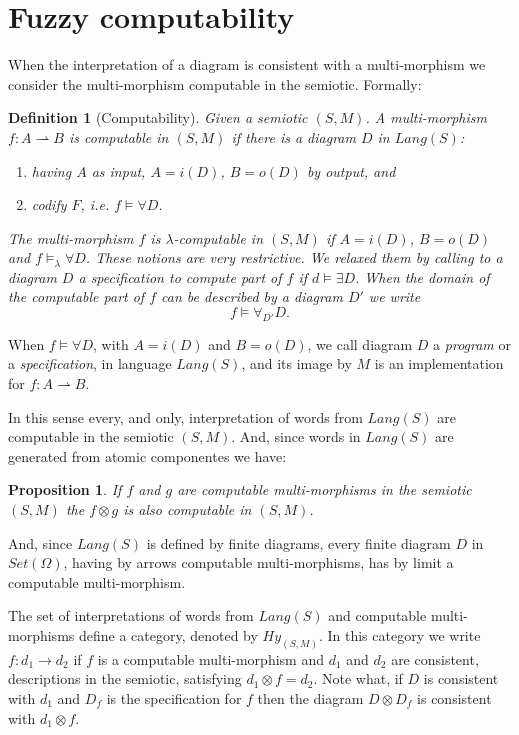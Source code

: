 \documentclass[oribibl]{llncs}
\newtheorem{prop}{Proposition}
\newtheorem{defn}{Definition}
\begin{document}
\section{Fuzzy computability}\label{fuzzy computability}
When the interpretation of a diagram is consistent with a multi-morphism we consider the multi-morphism computable in the semiotic. Formally:
\begin{defn}[Computability]
Given a semiotic $(S,M)$. A multi-morphism $f:A\rightharpoonup B$ is computable in $(S,M)$ if there is a diagram $D$ in $Lang(S)$:
\begin{enumerate}
  \item having $A$ as input, $A=i(D)$, $B=o(D)$ by output, and
  \item codify $F$, i.e. $f\models \forall D$.
\end{enumerate}
The multi-morphism $f$ is $\lambda$-computable in $(S,M)$ if $A=i(D)$, $B=o(D)$ and  $f\models_\lambda
\forall D$. These notions are very restrictive. We  relaxed them by calling to a diagram $D$ a specification to compute part of $f$ if
$d\models \exists D$. When the domain of the computable part of $f$ can be described by a diagram $D'$ we write \[f\models \forall_{D'} D.\]
\end{defn}

When $f\models \forall D$, with $A=i(D)$ and $B=o(D)$, we call diagram $D$ a \emph{program} or a \emph{specification}, in language $Lang(S)$, and its image by $M$ is an implementation for $f:A\rightharpoonup B$.

In this sense every, and only, interpretation of words from $Lang(S)$ are computable in the semiotic $(S,M)$. And, since words in $Lang(S)$ are generated from atomic componentes we have:
\begin{prop}
If $f$ and $g$ are computable multi-morphisms in the semiotic $(S,M)$ the $f\otimes g$ is also computable in $(S,M)$.
\end{prop}

And, since $Lang(S)$ is defined by finite diagrams, every finite diagram $D$ in $Set(\Omega)$, having by arrows computable multi-morphisms, has by limit a computable multi-morphism.

The set of interpretations of words from $Lang(S)$ and computable multi-morphisms define a category, denoted by $Hy_{(S,M)}$. In this category we write $f:d_1\rightarrow d_2$ if $f$ is a computable multi-morphism and $d_1$ and $d_2$ are consistent, descriptions in the semiotic, satisfying $d_1\otimes f=d_2$. Note what, if $D$ is consistent with $d_1$ and $D_f$ is the specification for $f$ then the diagram $D\otimes D_f$ is consistent with $d_1\otimes f$.
\end{document}
